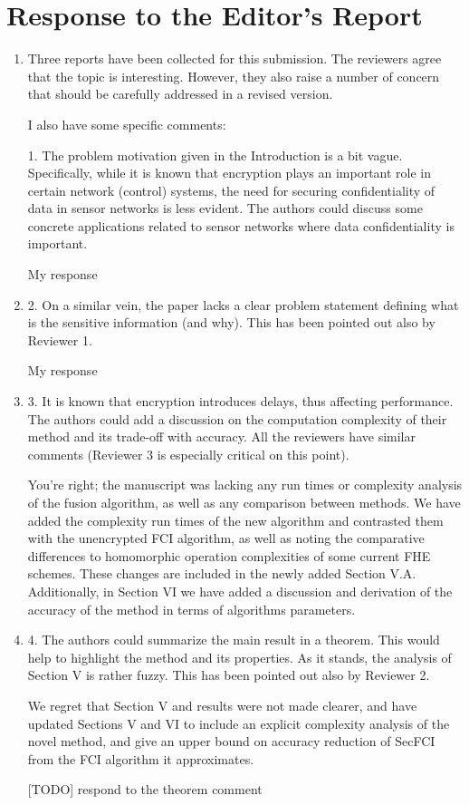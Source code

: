 \documentclass[a4paper]{scrartcl}
\newenvironment{rebuttal}{\begin{enumerate}[label={\color{grey}\thesection.\arabic{enumi}},leftmargin=0pt,ref=\thesection.\arabic{enumi}]}{\end{enumerate}}
\newcommand{\reviewtext}[1]{{\color{nblue} #1}}
\begin{document}
\section*{Response to the Editor's Report}
\def\thesection{E}
\begin{rebuttal} %
\item \reviewtext{Three reports have been collected for this submission. The reviewers
agree that the topic is interesting. However, they also raise a number
of concern that should be carefully addressed in a revised version. 

I also have some specific comments:

1. The problem motivation given in the Introduction is a bit vague.
Specifically, while it is known that encryption plays an important role
in certain network (control) systems, the need for securing
confidentiality of data in sensor networks is less evident. The authors
could discuss some concrete applications related to sensor networks
where data confidentiality is important.}

My response

\item \reviewtext{2. On a similar vein, the paper lacks a clear problem statement
defining what is the sensitive information (and why). This has been
pointed out also by Reviewer 1.}

My response

\item \reviewtext{3. It is known that encryption introduces delays, thus affecting
performance. The authors could add a discussion on the computation
complexity of their method and its trade-off with accuracy. All the
reviewers have similar comments (Reviewer 3 is especially critical on
this point).}

You're right; the manuscript was lacking any run times or complexity analysis of the fusion algorithm, as well as any comparison between methods. We have added the complexity run times of the new algorithm and contrasted them with the unencrypted FCI algorithm, as well as noting the comparative differences to homomorphic operation complexities of some current FHE schemes. These changes are included in the newly added Section V.A. Additionally, in Section VI we have added a discussion and derivation of the accuracy of the method in terms of algorithms parameters.

\item \reviewtext{4. The authors could summarize the main result in a theorem. This would
help to highlight the method and its properties. As it stands, the
analysis of Section V is rather fuzzy. This has been pointed out also
by Reviewer 2.}

We regret that Section V and results were not made clearer, and have updated Sections V and VI to include an explicit complexity analysis of the novel method, and give an upper bound on accuracy reduction of SecFCI from the FCI algorithm it approximates.

[TODO] respond to the theorem comment

\end{rebuttal}
\end{document}
